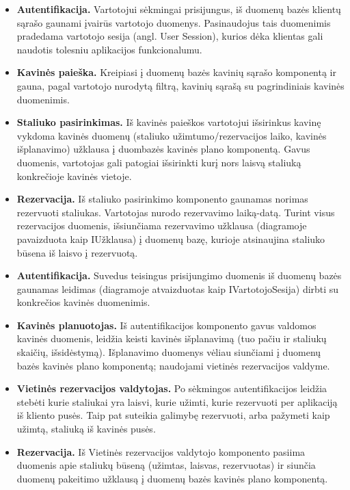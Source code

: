 \documentclass{VUMIFPSkursinis}
\begin{document}
\begin{itemize}
  \item \textbf{Autentifikacija.} Vartotojui sėkmingai prisijungus, iš duomenų bazės klientų sąrašo gaunami įvairūs vartotojo duomenys. Pasinaudojus tais duomenimis pradedama vartotojo sesija (angl. User Session), kurios dėka klientas gali naudotis tolesniu aplikacijos funkcionalumu.
  \item \textbf{Kavinės paieška.} Kreipiasi į duomenų bazės kavinių sąrašo komponentą ir gauna, pagal vartotojo nurodytą filtrą, kavinių sąrašą su pagrindiniais kavinės duomenimis.
  \item \textbf{Staliuko pasirinkimas.} Iš kavinės paieškos vartotojui išsirinkus kavinę vykdoma kavinės duomenų (staliuko užimtumo/rezervacijos laiko, kavinės išplanavimo) užklausa į duombazės kavinės plano komponentą. Gavus duomenis, vartotojas gali patogiai išsirinkti kurį nors laisvą staliuką konkrečioje kavinės vietoje.
  \item \textbf{Rezervacija.} Iš staliuko pasirinkimo komponento gaunamas norimas rezervuoti staliukas. Vartotojas nurodo rezervavimo laiką-datą. Turint visus rezervacijos duomenis, išsiunčiama rezervavimo užklausa (diagramoje pavaizduota kaip IUžklausa) į duomenų bazę, kurioje atsinaujina staliuko būsena iš laisvo į rezervuotą.
\end{itemize}

\begin{itemize}
  \item \textbf{Autentifikacija.} Suvedus teisingus prisijungimo duomenis iš duomenų bazės gaunamas leidimas (diagramoje atvaizduotas kaip IVartotojoSesija) dirbti su konkrečios kavinės duomenimis.
  \item \textbf{Kavinės planuotojas.} Iš autentifikacijos komponento gavus valdomos kavinės duomenis, leidžia keisti kavinės išplanavimą (tuo pačiu ir staliukų skaičių, išsidėstymą). Išplanavimo duomenys vėliau siunčiami į duomenų bazės kavinės plano komponentą; naudojami vietinės rezervacijos valdyme.
  \item \textbf{Vietinės rezervacijos valdytojas.} Po sėkmingos autentifikacijos leidžia stebėti kurie staliukai yra laisvi, kurie užimti, kurie rezervuoti per aplikaciją iš kliento pusės. Taip pat suteikia galimybę rezervuoti, arba pažymeti kaip užimtą, staliuką iš kavinės pusės.
  \item \textbf{Rezervacija.} Iš Vietinės rezervacijos valdytojo komponento pasiima duomenis apie staliukų būseną (užimtas, laisvas, rezervuotas) ir siunčia duomenų pakeitimo užklausą į duomenų bazės kavinės plano komponentą.
\end{itemize}
\end{document}
